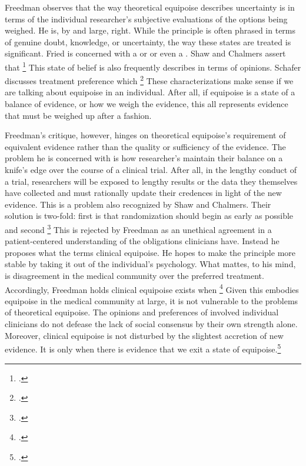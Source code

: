 \documentclass[letterpaper,notitlepage,12pt]{article}
\begin{document}
Freedman observes that the way theoretical equipoise describes uncertainty is in
terms of the individual researcher's subjective evaluations of the options being
weighed.
He is, by and large, right.
While the principle is often phrased in terms of genuine doubt, knowledge, or
uncertainty, the way these states are treated is significant.
Fried is concerned with a  or or even a
.
Shaw and Chalmers assert that \footcite[p.
494]{shaw_ethics_1970}
This state of belief is also frequently describes in terms of opinions.
Schafer discusses treatment preference which \footcite[p. 5]{schafer_commentary_1985}
These characterizations make sense if we are talking about equipoise in an
individual.
After all, if equipoise is a state of a balance of evidence, or how we weigh the
evidence, this all represents evidence that must be weighed up after a fashion.

Freedman's critique, however, hinges on theoretical equipoise's requirement of
equivalent evidence rather than the quality or sufficiency of the evidence.
The problem he is concerned with is how researcher's maintain their balance on a
knife's edge over the course of a clinical trial.
After all, in the lengthy conduct of a trial, researchers will be exposed to
lengthy results or the data they themselves have collected and must rationally
update their credences in light of the new evidence.
This is a problem also recognized by Shaw and Chalmers.
Their solution is two-fold: first is that randomization should begin as early as
possible and second \footcite[p. 493]{shaw_ethics_1970}
This is rejected by Freedman as an unethical agreement in a patient-centered
understanding of the obligations clinicians have.
Instead he proposes what the terms clinical equipoise.
He hopes to make the principle more stable by taking it out of the individual's
psychology.
What mattes, to his mind, is disagreement in the medical community over the
preferred treatment.
Accordingly, Freedman holds clinical equipoise exists when \footcite[p.
430]{freedman_equipoise_1987}
Given this embodies equipoise in the medical community at large, it is not
vulnerable to the problems of theoretical equipoise.
The opinions and preferences of involved individual clinicians do not defease the
lack of social consensus by their own strength alone.
Moreover, clinical equipoise is not disturbed by the slightest accretion of new
evidence.
It is only when there is evidence  that we exit a state of equipoise.\footcite[p.
430]{freedman_equipoise_1987}
\end{document}
